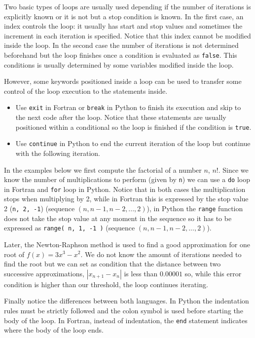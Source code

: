 Two basic types of loops are usually used depending 
if the number of iterations is explicitly known or 
it is not but a stop condition is known. 
In the first case, an index controls the loop: it usually has start and stop values and sometimes the increment in each iteration is specified.
Notice that this index cannot be modified inside the loop.
In the second case the number of iterations is not determined beforehand but 
the loop finishes once a condition is evaluated as \texttt{false}. 
This conditions is usually determined by some variables modified inside the loop.

However, some keywords positioned inside a loop can be used to transfer 
some control of the loop execution to the statements inside. 
\begin{itemize}
    \item Use \texttt{exit} in Fortran or \texttt{break} in Python to finish its execution and skip to the next code after the loop. 
    Notice that these statements are usually positioned within a conditional so the loop is finished if the condition is \texttt{true}.        
    \item Use \texttt{continue} in Python to end the current iteration of the loop but continue with the following iteration. 
\end{itemize}

In the examples below we first compute the factorial of a number $n$, $n!$.
Since we know the number of multiplications to perform (given by \texttt{n}) we can use a 
\texttt{do} loop in Fortran and 
\texttt{for} loop in Python.
Notice that in both cases the multiplication stops when multiplying by 2, 
while in Fortran this is expressed by the stop value 2 (\texttt{n, 2, -1}) (sequence $(n, n-1, n-2,...,2)$), 
in Python the \texttt{range} function does not take the stop value at any moment in the sequence
so it has to be expressed as \texttt{range( n, 1, -1 )} (sequence $(n, n-1, n-2,..., 2)$).

Later, the Newton-Raphson method is used to find a good approximation for one root of $f(x) = 3x^3-x^2$. 
We do not know the amount of iterations needed to find the root but we can set as condition that 
the distance between two successive approximations, $|x_{n+1} - x_n|$ is less than $0.00001$ so, while this error condition 
is higher than our threshold, the loop continues iterating.

Finally notice the differences between both languages. 
In Python the indentation rules must be strictly followed and the colon symbol is used before starting the body of the loop.
In Fortran, instead of indentation, the \texttt{end} statement indicates where the body of the loop ends. 


